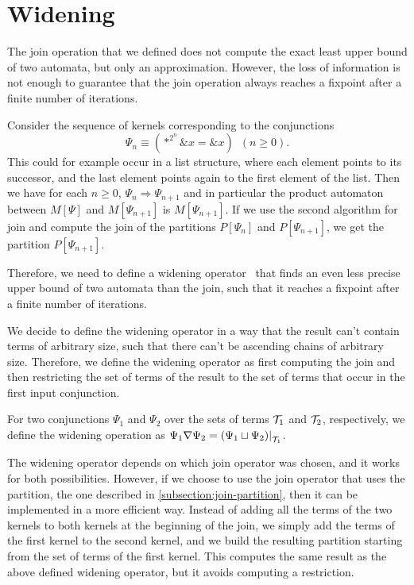 \section{Widening}

The join operation that we defined does not compute the exact least upper bound of two automata, but only an approximation.
However, the loss of information is not enough to guarantee that the join operation always reaches a fixpoint after a finite number of iterations.

\begin{example}\label{ex:widen-ascending-chain}
  Consider the sequence of kernels corresponding to the conjunctions
  \[
    \Psi_n \equiv (*^{2^n} \&x = \&x)\hspace{6pt} (n\geq 0).
  \]
  This could for example occur in a list structure, where each element points to its successor, and the last element points again to the first element of the list.
  Then we have for each $n \geq 0$, $\Psi_n \Longrightarrow \Psi_{n+1}$ and in particular the product automaton between $M[\Psi]$ and $M[\Psi_{n+1}]$ is $M[\Psi_{n+1}]$.
  If we use the second algorithm for join and compute the join of the partitions $P[\Psi_n]$ and $P[\Psi_{n+1}]$, we get the partition $P[\Psi_{n+1}]$.
\end{example}

Therefore, we need to define a widening operator~\cite{widening} that finds an even less precise upper bound of two automata than the join, such that it reaches a fixpoint after a finite number of iterations.

We decide to define the widening operator in a way that the result can't contain terms of arbitrary size, such that there can't be ascending chains of arbitrary size.
Therefore, we define the widening operator as first computing the join and then restricting the set of terms of the result to the set of terms that occur in the first input conjunction.

\begin{definition}
  For two conjunctions $\Psi_1$ and $\Psi_2$ over the sets of terms $\mathcal{T}_1$ and $\mathcal{T}_2$, respectively, we define the widening operation as
  $\Psi_1 \widen \Psi_2 = \restr{(\Psi_1 \join \Psi_2)}{\T_1}$.
\end{definition}

The widening operator depends on which join operator was chosen, and it
works for both possibilities.
However, if we choose to use the join operator that uses the partition, the one described in \cref{subsection:join-partition},
then it can be implemented in a more efficient way.
Instead of adding all the terms of the two kernels to both kernels at the beginning of the join,
we simply add the terms of the first kernel to the second kernel,
and we build the resulting partition starting from the set of terms of the first kernel.
This computes the same result as the above defined widening operator,
but it avoids computing a restriction.


